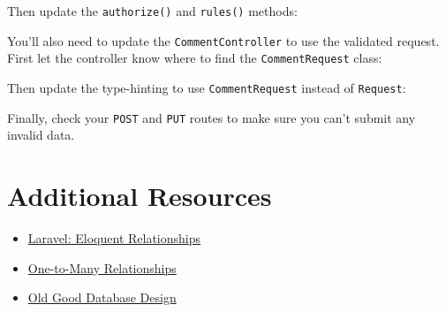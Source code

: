Then update the \texttt{authorize()} and \texttt{rules()} methods:


You'll also need to update the \texttt{CommentController} to use the validated request. First let the controller know where to find the \texttt{CommentRequest} class:


Then update the type-hinting to use \texttt{CommentRequest} instead of \texttt{Request}:


Finally, check your \texttt{POST} and \texttt{PUT} routes to make sure you can't submit any invalid data.


\section{Additional Resources}

\begin{itemize}[leftmargin=*]
    \item \href{http://laravel.com/docs/7.x/eloquent-relationships}{Laravel: Eloquent Relationships}
    \item \href{https://mysql.programmingpedia.net/en/tutorial/9600/one-to-many}{One-to-Many Relationships}
    \item \href{https://relinx.io/2020/09/14/old-good-database-design}{Old Good Database Design}
\end{itemize}
